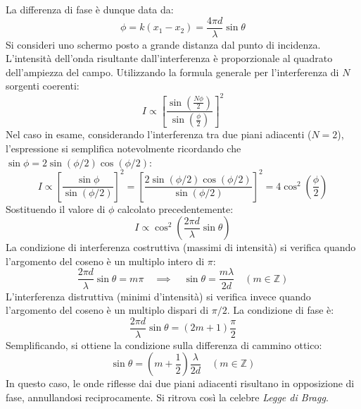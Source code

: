 \documentclass[a4paper,11pt]{report}
\begin{document}
\noindent
La differenza di fase è dunque data da:
\begin{equation}
    \phi = k(x_1 - x_2) = \frac{4\pi d}{\lambda}\sin\theta
\end{equation}
Si consideri uno schermo posto a grande distanza dal punto di incidenza. L'intensità dell'onda risultante dall'interferenza è proporzionale al quadrato dell'ampiezza del campo. Utilizzando la formula generale per l'interferenza di $N$ sorgenti coerenti:
\begin{equation}
    I \propto \left[ \frac{\sin\left(\frac{N\phi}{2}\right)}{\sin\left( \frac{\phi}{2}\right)} \right]^2
\end{equation}
Nel caso in esame, considerando l'interferenza tra due piani adiacenti ($N = 2$), l'espressione si semplifica notevolmente ricordando che $\sin\phi = 2\sin(\phi/2)\cos(\phi/2)$:
\begin{equation}
    I \propto \left[ \frac{\sin\phi}{\sin(\phi/2)} \right]^2 = \left[ \frac{2\sin(\phi/2)\cos(\phi/2)}{\sin(\phi/2)} \right]^2 = 4\cos^2\left(\frac{\phi}{2}\right)
\end{equation}
Sostituendo il valore di $\phi$ calcolato precedentemente:
\begin{equation}
    I \propto \cos^2\left( \frac{2\pi d}{\lambda}\sin\theta \right)
\end{equation}
La condizione di interferenza costruttiva (massimi di intensità) si verifica quando l'argomento del coseno è un multiplo intero di $\pi$:
\begin{equation}
    \frac{2\pi d}{\lambda}\sin\theta = m\pi \quad \implies \quad \sin\theta = \frac{m\lambda}{2d} \quad (m \in \mathbb{Z})
    \label{eq:condizione_bragg}
\end{equation}
L'interferenza distruttiva (minimi d'intensità) si verifica invece quando l'argomento del coseno è un multiplo dispari di $\pi/2$. La condizione di fase è:
\begin{equation}
    \frac{2\pi d}{\lambda}\sin\theta = (2m+1)\frac{\pi}{2}
\end{equation}
Semplificando, si ottiene la condizione sulla differenza di cammino ottico:
\begin{equation}
    \sin\theta = \left(m + \frac{1}{2}\right) \frac{\lambda}{2d} \quad (m \in \mathbb{Z})
    \label{eq:condizione_bragg_minimi}
\end{equation}
In questo caso, le onde riflesse dai due piani adiacenti risultano in opposizione di fase, annullandosi reciprocamente.
Si ritrova così la celebre \textit{Legge di Bragg}.
\end{document}
